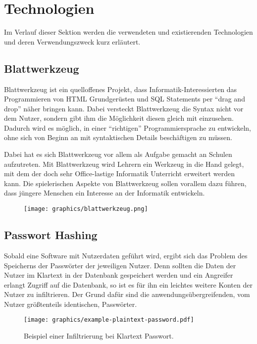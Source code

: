 \section{Technologien}
\label{sec:technology}
Im Verlauf dieser Sektion werden die verwendeten und existierenden Technologien und deren Verwendungszweck
kurz erläutert.

\subsection{Blattwerkzeug}
\label{sec:blattwerkzeug}
Blattwerkzeug ist ein quelloffenes Projekt, dass Informatik-Interessierten das Programmieren von \gls{HTML} Grundgerüsten und \gls{SQL} Statements per \enquote{drag and drop} näher bringen kann. Dabei versteckt Blattwerkzeug die Syntax nicht vor dem Nutzer, sondern gibt ihm die Möglichkeit diesen gleich mit einzusehen. Dadurch wird es möglich, in einer ``richtigen'' Programmiersprache zu entwickeln, ohne sich von Beginn an mit syntaktischen Details beschäftigen zu müssen.

Dabei hat es sich Blattwerkzeug vor allem als Aufgabe gemacht an Schulen aufzutreten. Mit Blattwerkzeug wird Lehrern ein Werkzeug in die Hand gelegt, mit dem der doch sehr Office-lastige Informatik Unterricht erweitert werden kann. Die spielerischen Aspekte von Blattwerkzeug sollen vorallem dazu führen, dass jüngere Menschen ein Interesse an der Informatik entwickeln.

\begin{figure}[h]
	\texttt{[image: graphics/blattwerkzeug.png]}
\end{figure}

\subsection{Passwort Hashing}
\label{sec:password_hashing}

Sobald eine Software mit Nutzerdaten geführt wird, ergibt sich das Problem des Speicherns der Passwörter der jeweiligen Nutzer.
Denn sollten die Daten der Nutzer im Klartext in der Datenbank gespeichert werden und ein Angreifer erlangt Zugriff auf die Datenbank, so ist es für ihn ein leichtes weitere Konten der Nutzer zu infiltrieren. Der Grund dafür sind die anwendungsübergreifenden, vom Nutzer grö{\ss}tenteils identischen, Passwörter.

\begin{figure}[h]
	\centering
	\texttt{[image: graphics/example-plaintext-password.pdf]}
	\caption{Beispiel einer Infiltrierung bei Klartext Passwort.}
\end{figure}

